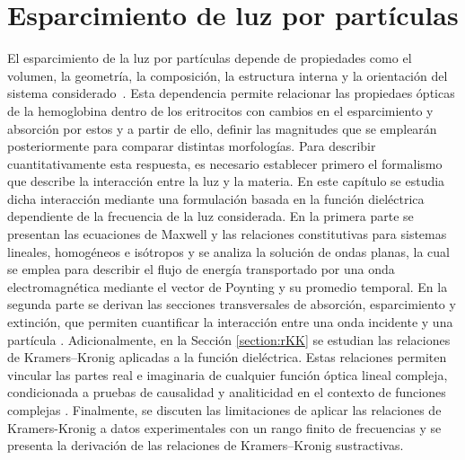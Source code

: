 
\chapter{Esparcimiento de luz por partículas}
\label{chapter:theory}


El esparcimiento de la luz por partículas depende de propiedades como el volumen, la geometría, la composición, la estructura interna y la orientación del sistema considerado~\cite{bohrenAbsorptionScatteringLight2008}. Esta dependencia permite relacionar las propiedaes ópticas de la hemoglobina dentro de los eritrocitos con cambios en el esparcimiento y absorción por estos y a partir de ello, definir las magnitudes que se emplearán posteriormente para comparar distintas morfologías. Para describir cuantitativamente esta respuesta, es necesario establecer primero el formalismo que describe la interacción entre la luz y la materia. En este capítulo se estudia dicha interacción mediante una formulación basada en la función dieléctrica dependiente de la frecuencia de la luz considerada. En la primera parte se presentan las ecuaciones de Maxwell y las relaciones constitutivas para sistemas lineales, homogéneos e isótropos y se analiza la solución de ondas planas, la cual se emplea para describir el flujo de energía transportado por una onda electromagnética mediante el vector de Poynting y su promedio temporal. En la segunda parte se derivan las secciones transversales de absorción, esparcimiento y extinción, que permiten cuantificar la interacción entre una onda incidente y una partícula \cite{bohrenAbsorptionScatteringLight2008}. Adicionalmente, en la Sección \ref{section:rKK} se estudian las relaciones de Kramers–Kronig aplicadas a la función dieléctrica. Estas relaciones permiten vincular las partes real e imaginaria de cualquier función óptica lineal compleja, condicionada a pruebas de causalidad y analiticidad en el contexto de funciones complejas \cite{lucariniKramersKronigRelationsOptical2005}. Finalmente, se discuten las limitaciones de aplicar las relaciones de Kramers-Kronig a datos experimentales con un rango finito de frecuencias y se presenta la derivación de las relaciones de Kramers–Kronig sustractivas. 


